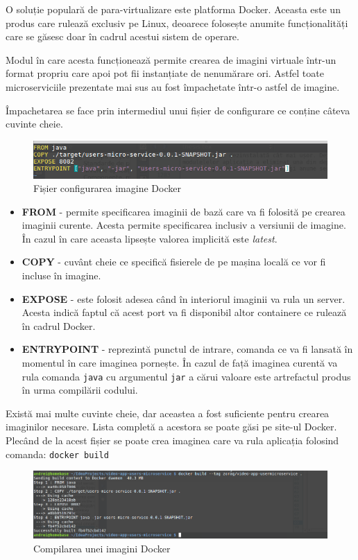 \documentclass[12pt, a4paper, oneside, romanian]{teza-upb}
\begin{document}
O soluție populară de para-virtualizare este platforma Docker. Aceasta este un produs care rulează exclusiv pe Linux, deoarece folosește anumite funcționalități care se găsesc doar în cadrul acestui sistem de operare. 

Modul în care acesta funcționează permite crearea de imagini virtuale într-un format propriu care apoi pot fii instanțiate de nenumărare ori. Astfel toate microserviciile prezentate mai sus au fost împachetate într-o astfel de imagine. 

Împachetarea se face prin intermediul unui fișier de configurare ce conține câteva cuvinte cheie.


\begin{figure}[ht]
\centering
\includegraphics[scale=0.8]{img/docker-file.png}
\caption{Fișier configurarea imagine Docker}
\label{fig:arhi_componente}
\end{figure}
\newpage
\begin{itemize}
 \item \textbf{FROM} - permite specificarea imaginii de bază care va fi folosită pe crearea imaginii curente. Acesta permite specificarea inclusiv a versiunii de imagine. În cazul în care aceasta lipsește valorea implicită este \textit{latest}.
 \item \textbf{COPY} - cuvânt cheie ce specifică fisierele de pe mașina locală ce vor fi incluse în imagine.
 \item \textbf{EXPOSE} - este folosit adesea când în interiorul imaginii va rula un server. Acesta indică faptul că acest port va fi disponibil altor containere ce rulează în cadrul Docker.
 \item \textbf{ENTRYPOINT} - reprezintă punctul de intrare, comanda ce va fi lansată în momentul în care imaginea pornește. În cazul de față imaginea curentă va rula comanda \texttt{java} cu argumentul \texttt{jar} a cărui valoare este artrefactul produs în urma compilării codului. 
 \end{itemize}
 
 Există mai multe cuvinte cheie, dar aceastea a fost suficiente pentru crearea imaginilor necesare. Lista completă a acestora se poate găsi pe site-ul Docker.
 Plecând de la acest fișier se poate crea imaginea care va rula aplicația folosind comanda: \texttt{docker build}
  \begin{figure}[ht]
\centering
\includegraphics[scale=0.8]{img/docker-build-output.png}
\caption{Compilarea unei imagini Docker}
\label{fig:arhi_componente}
\end{figure}
\end{document}
